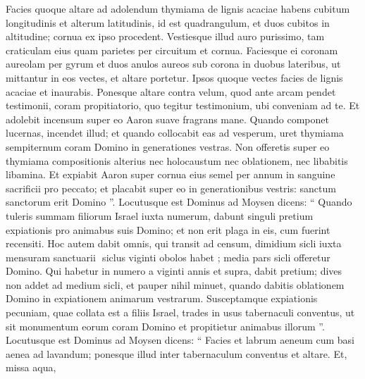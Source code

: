 \begin{biblechapter}
\begin{biblechapter}
\begin{biblechapter}
\begin{biblechapter}
\begin{biblechapter}
\begin{biblechapter}
\begin{biblechapter}
\begin{biblechapter}
\begin{biblechapter}
\begin{biblechapter}
\begin{biblechapter}
\begin{biblechapter}
\begin{biblechapter}
\begin{biblechapter}
\begin{biblechapter}
\begin{biblechapter}
\begin{biblechapter}
\begin{biblechapter}
\begin{biblechapter}
\begin{biblechapter}
\begin{biblechapter}
\begin{biblechapter}
\begin{biblechapter}
\begin{biblechapter}
\begin{biblechapter}
\begin{biblechapter}
\begin{biblechapter}
\begin{biblechapter}
\begin{biblechapter}
\begin{biblechapter}
\verse Facies quoque altare ad adolendum thymiama de lignis acaciae 
\verse habens cubitum longitudinis et alterum latitudinis, id est quadrangulum, et duos cubitos in altitudine; cornua ex ipso procedent. 
\verse Vestiesque illud auro purissimo, tam craticulam eius quam parietes per circuitum et cornua. Faciesque ei coronam aureolam per gyrum 
\verse et duos anulos aureos sub corona in duobus lateribus, ut mittantur in eos vectes, et altare portetur. 
\verse Ipsos quoque vectes facies de lignis acaciae et inaurabis. 
\verse Ponesque altare contra velum, quod ante arcam pendet testimonii, coram propitiatorio, quo tegitur testimonium, ubi conveniam ad te. 
\verse Et adolebit incensum super eo Aaron suave fragrans mane. Quando componet lucernas, incendet illud; 
\verse et quando collocabit eas ad vesperum, uret thymiama sempiternum coram Domino in generationes vestras. 
\verse Non offeretis super eo thymiama compositionis alterius nec holocaustum nec oblationem, nec libabitis libamina. 
\verse Et expiabit Aaron super cornua eius semel per annum in sanguine sacrificii pro peccato; et placabit super eo in generationibus vestris: sanctum sanctorum erit Domino ”.
 \verse Locutusque est Dominus ad Moysen dicens: 
\verse “ Quando tuleris summam filiorum Israel iuxta numerum, dabunt singuli pretium expiationis pro animabus suis Domino; et non erit plaga in eis, cum fuerint recensiti. 
\verse Hoc autem dabit omnis, qui transit ad censum, dimidium sicli iuxta mensuram sanctuarii ­ siclus viginti obolos habet ­; media pars sicli offeretur Domino. 
\verse Qui habetur in numero a viginti annis et supra, dabit pretium; 
\verse dives non addet ad medium sicli, et pauper nihil minuet, quando dabitis oblationem Domino in expiationem animarum vestrarum. 
\verse Susceptamque expiationis pecuniam, quae collata est a filiis Israel, trades in usus tabernaculi conventus, ut sit monumentum eorum coram Domino et propitietur animabus illorum ”.
 \verse Locutusque est Dominus ad Moysen dicens: 
\verse “ Facies et labrum aeneum cum basi aenea ad lavandum; ponesque illud inter tabernaculum conventus et altare. Et, missa aqua, 

\end{biblechapter}
\end{biblechapter}
\end{biblechapter}
\end{biblechapter}
\end{biblechapter}
\end{biblechapter}
\end{biblechapter}
\end{biblechapter}
\end{biblechapter}
\end{biblechapter}
\end{biblechapter}
\end{biblechapter}
\end{biblechapter}
\end{biblechapter}
\end{biblechapter}
\end{biblechapter}
\end{biblechapter}
\end{biblechapter}
\end{biblechapter}
\end{biblechapter}
\end{biblechapter}
\end{biblechapter}
\end{biblechapter}
\end{biblechapter}
\end{biblechapter}
\end{biblechapter}
\end{biblechapter}
\end{biblechapter}
\end{biblechapter}
\end{biblechapter}
